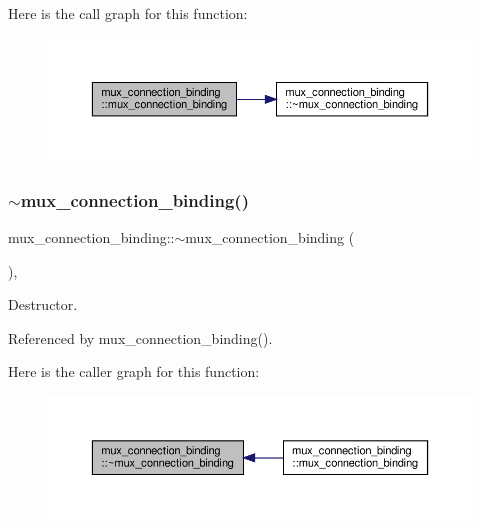 Here is the call graph for this function\+:
\nopagebreak
\begin{figure}[H]
\begin{center}
\leavevmode
\includegraphics[width=350pt]{d7/d1e/classmux__connection__binding_a24be4eb50d6efd12ec88d90e6efd139d_cgraph}
\end{center}
\end{figure}
\mbox{\label{classmux__connection__binding_aa93fc534c265dc11637ef16d550e13e0}} 
\subsubsection{\texorpdfstring{$\sim$mux\+\_\+connection\+\_\+binding()}{~mux\_connection\_binding()}}
{\footnotesize\ttfamily mux\+\_\+connection\+\_\+binding\+::$\sim$mux\+\_\+connection\+\_\+binding (\begin{DoxyParamCaption}{ }\end{DoxyParamCaption})\hspace{0.3cm}{\ttfamily [override]}, {\ttfamily [default]}}



Destructor. 



Referenced by mux\+\_\+connection\+\_\+binding().

Here is the caller graph for this function\+:
\nopagebreak
\begin{figure}[H]
\begin{center}
\leavevmode
\includegraphics[width=350pt]{d7/d1e/classmux__connection__binding_aa93fc534c265dc11637ef16d550e13e0_icgraph}
\end{center}
\end{figure}


